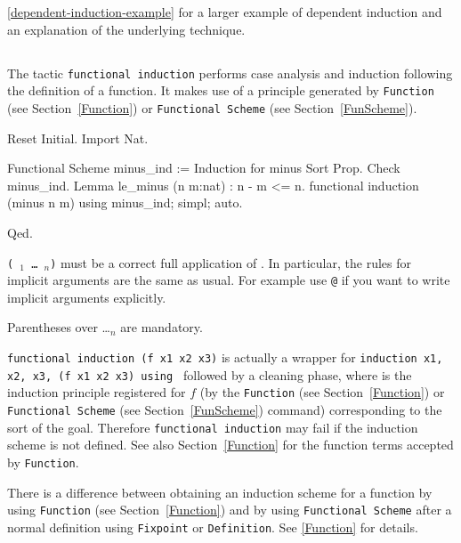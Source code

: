 \SeeAlso \ref{dependent-induction-example} for a larger example of
dependent induction and an explanation of the underlying technique.

\subsection{}
\label{FunInduction}

The tactic \texttt{functional induction} performs
case analysis and induction following the definition of a function. It
makes use of a principle generated by \texttt{Function}
(see Section~\ref{Function}) or \texttt{Functional Scheme}
(see Section~\ref{FunScheme}).

\begin{coq_eval}
Reset Initial.
Import Nat.
\end{coq_eval}
\begin{coq_example}
Functional Scheme minus_ind := Induction for minus Sort Prop.
Check minus_ind.
Lemma le_minus (n m:nat) : n - m <= n.
functional induction (minus n m) using minus_ind; simpl; auto.
\end{coq_example}
\begin{coq_example*}
Qed.
\end{coq_example*}

\Rem \texttt{(\qualid\ \term$_1$ \dots\ \term$_n$)} must be a correct
full application of \qualid. In particular, the rules for implicit
arguments are the same as usual. For example use \texttt{@\qualid} if
you want to write implicit arguments explicitly.

\Rem Parentheses over \qualid \dots \term$_n$ are mandatory.

\Rem \texttt{functional induction (f x1 x2 x3)} is actually a wrapper
for \texttt{induction x1, x2, x3, (f x1 x2 x3) using \qualid} followed by
a cleaning phase, where {\qualid} is the induction principle
registered for $f$ (by the \texttt{Function} (see Section~\ref{Function})
or \texttt{Functional Scheme} (see Section~\ref{FunScheme}) command)
corresponding to the sort of the goal.  Therefore \texttt{functional
  induction} may fail if the induction scheme {\qualid} is
not defined. See also Section~\ref{Function} for the function terms
accepted by \texttt{Function}.

\Rem There is a difference between obtaining an induction scheme for a
function by using \texttt{Function} (see Section~\ref{Function}) and by
using \texttt{Functional Scheme} after a normal definition using
\texttt{Fixpoint} or \texttt{Definition}. See \ref{Function} for
details.

